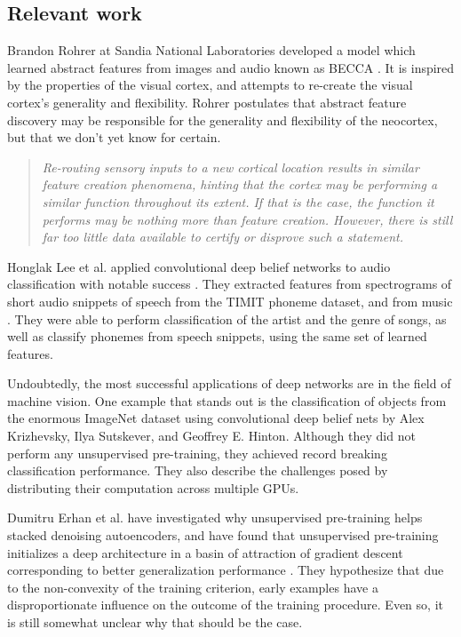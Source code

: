 \documentclass[12pt]{article}
\begin{document}
\begin{doublespacing}
	\subsection{Relevant work}
	Brandon Rohrer at Sandia National Laboratories developed a model which learned abstract features from images and audio known as BECCA \cite{rohrer2011biologically}. It is inspired by the properties of the visual cortex, and attempts to re-create the visual cortex's generality and flexibility. Rohrer postulates that abstract feature discovery may be responsible for the generality and flexibility of the neocortex, but that we don't yet know for certain.

\begin{quote}
\singlespacing
\em Re-routing sensory inputs to a new cortical location results in similar feature creation phenomena, hinting that the cortex may be performing a similar function throughout its extent. If that is the case, the function it performs may be nothing more than feature creation. However, there is still far too little data available to certify or disprove such a statement.
\end{quote}

Honglak Lee et al. applied convolutional deep belief networks to audio classification with notable success \cite{lee2009unsupervised}. They extracted features from spectrograms of short audio snippets of speech from the TIMIT phoneme dataset, and from music \cite{timit}. They were able to perform classification of the artist and the genre of songs, as well as classify phonemes from speech snippets, using the same set of learned features.

Undoubtedly, the most successful applications of deep networks are in the field of machine vision. One example that stands out is the classification of objects from the enormous ImageNet dataset using convolutional deep belief nets by Alex Krizhevsky, Ilya Sutskever, and Geoffrey E. Hinton\cite{krizhevsky2012imagenet, imagenet_cvpr09}. Although they did not perform any unsupervised pre-training, they achieved record breaking classification performance. They also describe the challenges posed by distributing their computation across multiple GPUs.

Dumitru Erhan et al. have investigated why unsupervised pre-training helps stacked denoising autoencoders, and have found that unsupervised pre-training initializes a deep architecture in a basin of attraction of gradient descent corresponding to better generalization performance \cite{erhan2010does}. They hypothesize that due to the non-convexity of the training criterion, early examples have a disproportionate influence on the outcome of the training procedure. Even so, it is still somewhat unclear why that should be the case. 


\end{doublespacing}
\end{document}

